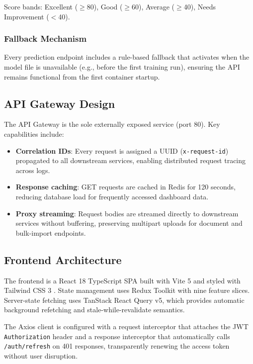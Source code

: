 \documentclass[conference]{IEEEtran}
\begin{document}
\noindent Score bands: Excellent ($\geq$80), Good ($\geq$60),
Average ($\geq$40), Needs Improvement ($<$40).

\subsubsection{Fallback Mechanism}

Every prediction endpoint includes a rule-based fallback that activates when
the model file is unavailable (e.g., before the first training run), ensuring
the API remains functional from the first container startup.

\subsection{API Gateway Design}

The API Gateway is the sole externally exposed service (port 80). Key
capabilities include:

\begin{itemize}
  \item \textbf{Correlation IDs}: Every request is assigned a UUID
    (\texttt{x-request-id}) propagated to all downstream services, enabling
    distributed request tracing across logs.
  \item \textbf{Response caching}: GET requests are cached in Redis for 120
    seconds, reducing database load for frequently accessed dashboard data.
  \item \textbf{Proxy streaming}: Request bodies are streamed directly to
    downstream services without buffering, preserving multipart uploads for
    document and bulk-import endpoints.
\end{itemize}

\subsection{Frontend Architecture}

The frontend is a React 18 TypeScript SPA built with Vite 5 and styled with
Tailwind CSS 3 \cite{react}. State management uses Redux Toolkit \cite{abramov}
with nine feature slices. Server-state fetching uses TanStack React Query v5,
which provides automatic background refetching and stale-while-revalidate
semantics.

The Axios client is configured with a request interceptor that attaches the JWT
\texttt{Authorization} header and a response interceptor that automatically
calls \texttt{/auth/refresh} on 401 responses, transparently renewing the access
token without user disruption.
\end{document}
